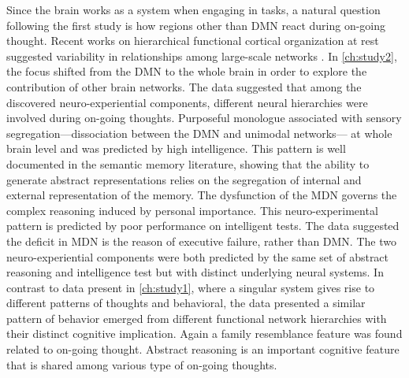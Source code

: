 Since the brain works as a system when engaging in tasks, a natural question following the first study is how regions other than DMN react during on-going thought. Recent works on hierarchical functional cortical organization at rest suggested variability in relationships among large-scale networks \cite{Margulies2016}. In \cref{ch:study2}, the focus shifted from the DMN to the whole brain in order to explore the contribution of other brain networks. The data suggested that among the discovered neuro-experiential components, different neural hierarchies were involved during on-going thoughts. Purposeful monologue associated with sensory segregation---dissociation between the DMN and unimodal networks--- at whole brain level and was predicted by high intelligence. This pattern is well documented in the semantic memory literature, showing that the ability to generate abstract representations relies on the segregation of internal and external representation of the memory. The dysfunction of the MDN \cite{Duncan2010} governs the complex reasoning induced by personal importance. This neuro-experimental pattern is predicted by poor performance on intelligent tests. The data suggested the deficit in MDN is the reason of executive failure, rather than DMN. The two neuro-experiential components were both predicted by the same set of abstract reasoning and intelligence test but with distinct underlying neural systems. In contrast to data present in \cref{ch:study1}, where a singular system gives rise to different patterns of thoughts and behavioral, the data presented a similar pattern of behavior emerged from different functional network hierarchies with their distinct cognitive implication. Again a family resemblance feature was found related to on-going thought. Abstract reasoning is an important cognitive feature that is shared among various type of on-going thoughts. 

